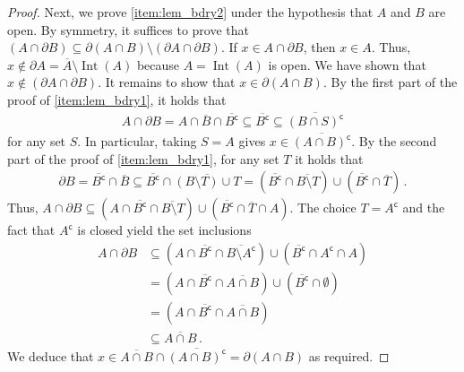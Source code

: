 \documentclass[pdflatex,sn-mathphys-num]{sn-jnl-preprint}
\DeclareMathOperator{\Int}{Int} %
\newcommand{\comp}{\textsf{c}} %
\theoremstyle{thmstyleone}%
\theoremstyle{thmstyletwo}%
\theoremstyle{thmstylethree}%
\numberwithin{equation}{section}
\numberwithin{theorem}{section}
\begin{document}
\begin{appendices}
\begin{proof}
	Next, we prove \cref{item:lem_bdry2} under the hypothesis that $A$ and $B$ are open. By symmetry, it suffices to prove that $(A\cap\partial B)\subseteq \partial(A\cap B)\setminus (\partial A\cap\partial B)$. If $x\in A\cap\partial B$, then $x\in A$. Thus, $x\notin\partial A=\overline{A}\setminus\Int(A)$ because $A=\Int(A)$ is open. We have shown that $x\notin (\partial A\cap\partial B)$. It remains to show that $x\in\partial(A\cap B)$. By the first part of the proof of \cref{item:lem_bdry1}, it holds that
	\begin{align*}
		A\cap\partial B=A\cap \overline{B}\cap\overline{B^\comp}\subseteq \overline{B^\comp}\subseteq \overline{(B\cap S)^\comp}
	\end{align*}
	for any set $S$. In particular, taking $S=A$ gives $x\in \overline{(A\cap B)^\comp}$. By the second part of the proof of \cref{item:lem_bdry1}, for any set $T$ it holds that
	\begin{align*}
		\partial B = \overline{B^\comp}\cap \overline{B}\subseteq  \overline{B^\comp}\cap\overline{(B\setminus T)\cup T}= (\overline{B^\comp} \cap \overline{B\setminus T}) \cup (\overline{B^\comp} \cap \overline{T})\,.
	\end{align*}
	Thus, $A\cap \partial B\subseteq (A\cap \overline{B^\comp} \cap \overline{B\setminus T}) \cup (\overline{B^\comp} \cap \overline{T}\cap A)$. The choice $T=A^\comp$ and the fact that $A^\comp$ is closed yield the set inclusions
	\begin{align*}
		A\cap \partial B& \subseteq (A\cap \overline{B^\comp} \cap \overline{B\setminus A^\comp}) \cup (\overline{B^\comp} \cap A^\comp \cap A)\\
		&= (A\cap \overline{B^\comp} \cap \overline{A\cap B}) \cup (\overline{B^\comp} \cap \emptyset)\\
		& = (A\cap \overline{B^\comp} \cap \overline{A\cap B})\\
		&\subseteq \overline{A\cap B}\,.
	\end{align*}
	We deduce that $x\in \overline{A\cap B}\cap \overline{(A\cap B)^\comp} = \partial (A\cap B)$ as required.
\end{proof}


\end{appendices}
\end{document}
